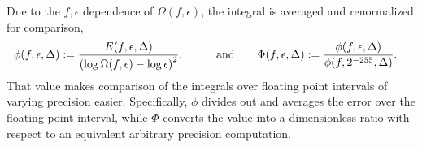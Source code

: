 \documentclass[]{elsarticle}
\begin{document}
Due to the $f,\epsilon$ dependence of $\Omega(f,\epsilon)$, the integral is averaged and renormalized for comparison,
\begin{align*}
	\phi(f,\epsilon,\Delta)&:=\frac{E(f,\epsilon,\Delta)}{\left(\log\Omega(f,\epsilon)-\log\epsilon\right)^2}, & \qquad \text{and} \qquad & \Phi(f,\epsilon,\Delta) := \frac{\phi(f,\epsilon,\Delta)}{\phi(f,2^{-255},\Delta)}.
\end{align*}
That value makes comparison of the integrals over floating point intervals of varying precision easier.
Specifically, $\phi$ divides out and averages the error over the floating point interval, while $\Phi$ converts the value into a dimensionless ratio with respect to an equivalent arbitrary precision computation.
\end{document}
